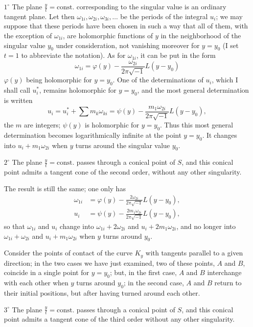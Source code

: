 \documentclass{article}
\begin{document}
$1^{\circ}$ The plane $\frac{y}{t} = \text{const.}$ corresponding to the singular value is an ordinary tangent plane. Let then $\omega_{1i}, \omega_{2i}, \omega_{3i}, \ldots$ be the periods of the integral $u_{i}$; we may suppose that these periods have been chosen in such a way that all of them, with the exception of $\omega_{1i}$, are holomorphic functions of $y$ in the neighborhood of the singular value $y_{0}$ under consideration, not vanishing moreover for $y = y_{0}$ (I set $t = 1$ to abbreviate the notation). As for $\omega_{1i}$, it can be put in the form
\[
\omega_{1i} = \varphi(y) - \frac{\omega_{2i}}{2\pi\sqrt{-1}} L(y - y_{0})
\]
$\varphi(y)$ being holomorphic for $y = y_{0}$. One of the determinations of $u_{i}$, which I shall call $u_{i}^{*}$, remains holomorphic for $y = y_{0}$, and the most general determination is written
\[
u_{i} = u_{i}^{*} + \displaystyle\sum m_{k} \omega_{ki} = \psi(y) - \frac{m_{1}\omega_{2i}}{2\pi\sqrt{-1}} L(y - y_{0}),
\]
the $m$ are integers; $\psi(y)$ is holomorphic for $y = y_{0}$. Thus this most general determination becomes logarithmically infinite at the point $y = y_{0}$. It changes into $u_{i} + m_{1} \omega_{2i}$ when $y$ turns around the singular value $y_{0}$.

$2^{\circ}$ The plane $\frac{y}{t} = \text{const.}$ passes through a conical point of $S$, and this conical point admits a tangent cone of the second order, without any other singularity.

The result is still the same; one only has
\[
\begin{aligned}
\omega_{1i} &= \varphi(y) - \frac{2\omega_{2i}}{2\pi\sqrt{-1}} L(y - y_{0}), \\
u_{i} &= \psi(y) - \frac{2m_{1}\omega_{2i}}{2\pi\sqrt{-1}} L(y - y_{0}),
\end{aligned}
\]
so that $\omega_{1i}$ and $u_{i}$ change into $\omega_{1i} + 2\omega_{2i}$ and $u_{i} + 2m_{1} \omega_{2i}$, and no longer into $\omega_{1i} + \omega_{2i}$ and $u_{i} + m_{1} \omega_{2i}$ when $y$ turns around $y_{0}$.

Consider the points of contact of the curve $K_{y}$ with tangents parallel to a given direction; in the two cases we have just examined, two of these points, $A$ and $B$, coincide in a single point for $y = y_{0}$; but, in the
first case, $A$ and $B$ interchange with each other when $y$ turns around $y_{0}$; in the second case, $A$ and $B$ return to their initial positions, but after having turned around each other.

$3^{\circ}$ The plane $\frac{y}{t} = \text{const.}$ passes through a conical point of $S$, and this conical point admits a tangent cone of the third order without any other singularity.
\end{document}
